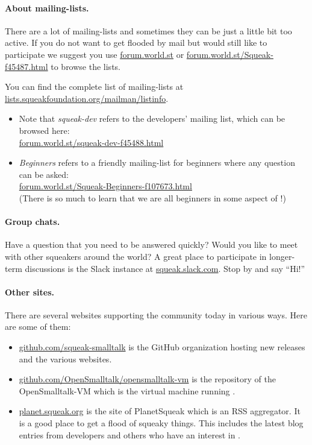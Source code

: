 \documentclass[a4paper,10pt,twoside]{book}
\begin{document}
\paragraph{About mailing-lists.}
There are a lot of mailing-lists and sometimes they can be just a little bit too active.
If you do not want to get flooded by mail but would still like to participate we suggest you use \url{forum.world.st} or \url{forum.world.st/Squeak-f45487.html} to browse the lists.

You can find the complete list of \sq mailing-lists at \url{lists.squeakfoundation.org/mailman/listinfo}.

\begin{itemize}
\item Note that \emph{squeak-dev} refers to the developers' mailing list, which can be browsed here:\\
\url{forum.world.st/squeak-dev-f45488.html}
\item \emph{Beginners} refers to a friendly mailing-list for beginners where any question can be asked:\\
\url{forum.world.st/Squeak-Beginners-f107673.html}\\
(There is so much to learn that we are all beginners in some aspect of \sq!)
\end{itemize}

\paragraph{Group chats.}
Have a question that you need to be answered quickly?
Would you like to meet with other squeakers around the world?
A great place to participate in longer-term discussions is the Slack instance at \url{squeak.slack.com}.
Stop by and say ``Hi!''

\paragraph{Other sites.} There are several websites supporting the \sq community today in various ways.
Here are some of them:
\begin{itemize}
  \item \url{github.com/squeak-smalltalk} is the GitHub organization hosting new releases and the various \sq websites.
	
  \item \url{github.com/OpenSmalltalk/opensmalltalk-vm} is the repository of the OpenSmalltalk-VM which is the virtual machine running \sq.

  \item \url{planet.squeak.org} is the site of PlanetSqueak which is an RSS aggregator.
  It is a good place to get a flood of squeaky things.
  This includes the latest blog entries from developers and others who have an interest in \sq.
\end{itemize}
\end{document}
